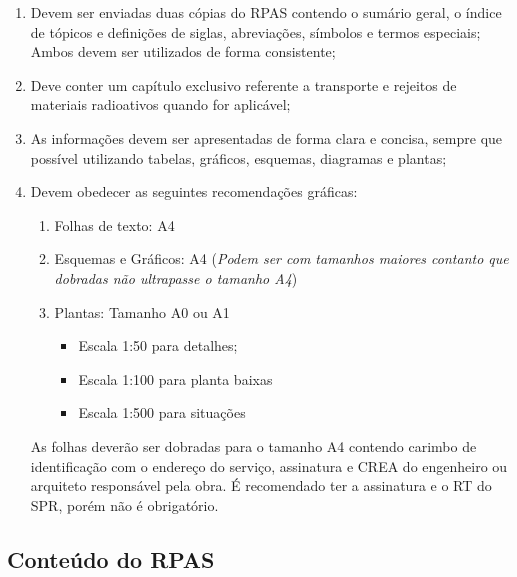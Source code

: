 \documentclass[11pt,a4paper]{article}
\begin{document}
            \begin{enumerate}
                \item Devem ser enviadas duas cópias do RPAS contendo o sumário geral, o índice de tópicos e definições de siglas, abreviações, símbolos e termos especiais; Ambos devem ser utilizados de forma consistente;
                \item Deve conter um capítulo exclusivo referente a transporte e rejeitos de materiais radioativos quando for aplicável;
                \item As informações devem ser apresentadas de forma clara e concisa, sempre que possível utilizando tabelas, gráficos, esquemas, diagramas e plantas;
                \item Devem obedecer as seguintes recomendações gráficas:

                    \begin{enumerate}
                        \item Folhas de texto: A4
                        \item Esquemas e Gráficos: A4 (\textit{Podem ser com tamanhos maiores contanto que dobradas não ultrapasse o tamanho A4})
                        \item Plantas: Tamanho A0 ou A1
                            \begin{itemize}
                                \item Escala 1:50 para detalhes;
                                \item Escala 1:100 para planta baixas
                                \item Escala 1:500 para situações
                            \end{itemize}
                    \end{enumerate}

                    As folhas deverão ser dobradas para o tamanho A4 contendo carimbo de identificação com  o endereço do serviço, assinatura e CREA do engenheiro ou arquiteto responsável pela obra. É recomendado ter a assinatura e o RT do SPR, porém não é obrigatório.
            \end{enumerate}

        \subsection{Conteúdo do RPAS}
            
\end{document}
